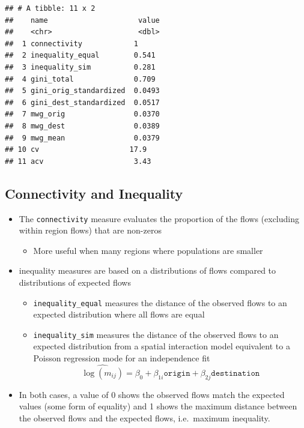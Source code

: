 \documentclass[
]{book}
\providecommand{\tightlist}{%
  \setlength{\itemsep}{0pt}\setlength{\parskip}{0pt}}
\begin{document}
\begin{verbatim}
## # A tibble: 11 x 2
##    name                     value
##    <chr>                    <dbl>
##  1 connectivity            1     
##  2 inequality_equal        0.541 
##  3 inequality_sim          0.281 
##  4 gini_total              0.709 
##  5 gini_orig_standardized  0.0493
##  6 gini_dest_standardized  0.0517
##  7 mwg_orig                0.0370
##  8 mwg_dest                0.0389
##  9 mwg_mean                0.0379
## 10 cv                     17.9   
## 11 acv                     3.43
\end{verbatim}

\hypertarget{connectivity-and-inequality}{%
\subsection{Connectivity and Inequality}\label{connectivity-and-inequality}}

\begin{itemize}
\tightlist
\item
  The \texttt{connectivity} measure evaluates the proportion of the flows (excluding within region flows) that are non-zeros

  \begin{itemize}
  \tightlist
  \item
    More useful when many regions where populations are smaller
  \end{itemize}
\item
  \citet{Bell2002} inequality measures are based on a distributions of flows compared to distributions of expected flows

  \begin{itemize}
  \tightlist
  \item
    \texttt{inequality\_equal} measures the distance of the observed flows to an expected distribution where all flows are equal
  \item
    \texttt{inequality\_sim} measures the distance of the observed flows to an expected distribution from a spatial interaction model equivalent to a Poisson regression mode for an independence fit
    \[
    \widehat{\log(m_{ij})} = \beta_0 + \beta_{1i} \texttt{origin} + \beta_{2j} \texttt{destination}
    \]
  \end{itemize}
\item
  In both cases, a value of 0 shows the observed flows match the expected values (some form of equality) and 1 shows the maximum distance between the observed flows and the expected flows, i.e.~maximum inequality.
\end{itemize}
\end{document}
